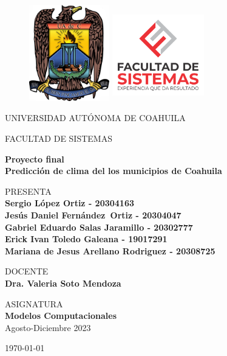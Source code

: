 \thispagestyle{empty}
	
	\begin{figure}[ht]
			\includegraphics[width=3.5cm]{uadec-original.jpg}
			\label{EscudoUAdeC}
	   \endminipage
			\includegraphics[height = 4cm ,width=4cm]{ImagotipoVertical.png}
			\label{EscudoFS}
		\endminipage
	\end{figure}
	
	\begin{center}
	\vspace{0.8cm}
	\LARGE
	UNIVERSIDAD AUTÓNOMA DE COAHUILA
	
	\vspace{0.8cm}
	\LARGE
	FACULTAD DE SISTEMAS
	
	\vspace{1.7cm}	
	\Large
	\textbf{Proyecto final \\ Predicción de clima del los municipios de Coahuila}

	\vspace{1.3cm}
	\normalsize	
	PRESENTA \\
	\vspace{.3cm}
	\large
	\textbf{Sergio López Ortiz - 20304163 \\ Jesús Daniel Fernández Ortiz - 20304047 \\ Gabriel Eduardo Salas Jaramillo - 20302777 \\ Erick Ivan Toledo Galeana - 19017291 \\ Mariana de Jesus Arellano Rodriguez - 20308725}
	
	\vspace{1.3cm}
	\normalsize	
	DOCENTE \\
	\vspace{.3cm}
	\large
	\textbf{Dra. Valeria Soto Mendoza}
	
	\vspace{1.3cm}
	\normalsize	
	ASIGNATURA \\
	\vspace{.3cm}
	\large
	\textbf{Modelos Computacionales}\\ Agosto-Diciembre 2023
	
	\vspace{1.3cm}
	\today
	\end{center}
	
